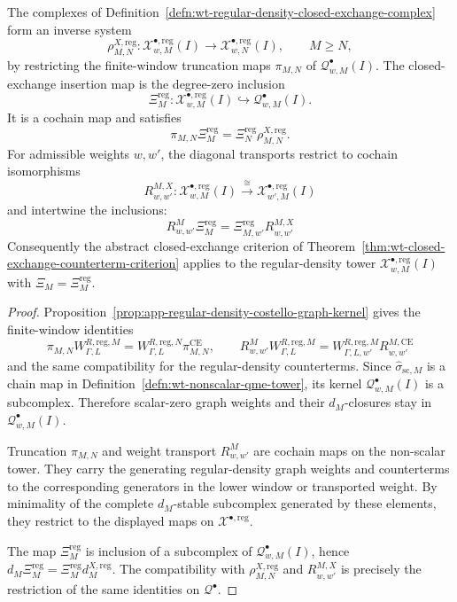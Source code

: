 \begin{prop}
\label{prop:wt-regular-density-X-Xi-construction}
  The complexes of
  Definition~\ref{defn:wt-regular-density-closed-exchange-complex} form an
  inverse system
  \[
    \rho^{X,\mathrm{reg}}_{M,N}\colon
    \mathcal X^{\bullet,\mathrm{reg}}_{w,M}(I)
      \longrightarrow
    \mathcal X^{\bullet,\mathrm{reg}}_{w,N}(I),
    \qquad M\geq N,
  \]
  by restricting the finite-window truncation maps
  \(\pi_{M,N}\) of \(\mathcal Q^\bullet_{w,M}(I)\).  The closed-exchange
  insertion map is the degree-zero inclusion
  \[
    \Xi^{\mathrm{reg}}_M\colon
    \mathcal X^{\bullet,\mathrm{reg}}_{w,M}(I)
      \hookrightarrow
    \mathcal Q^\bullet_{w,M}(I).
  \]
  It is a cochain map and satisfies
  \[
    \pi_{M,N}\Xi^{\mathrm{reg}}_M
      =
    \Xi^{\mathrm{reg}}_N\rho^{X,\mathrm{reg}}_{M,N}.
  \]
  For admissible weights \(w,w'\), the diagonal transports restrict to
  cochain isomorphisms
  \[
    R^{M,X}_{w,w'}\colon
    \mathcal X^{\bullet,\mathrm{reg}}_{w,M}(I)
      \xrightarrow{\cong}
    \mathcal X^{\bullet,\mathrm{reg}}_{w',M}(I)
  \]
  and intertwine the inclusions:
  \[
    R^M_{w,w'}\Xi^{\mathrm{reg}}_M
      =
    \Xi^{\mathrm{reg}}_{M,w'}R^{M,X}_{w,w'}
  \]
  Consequently the abstract closed-exchange criterion of
  Theorem~\ref{thm:wt-closed-exchange-counterterm-criterion} applies to
  the regular-density tower
  \(\mathcal X^{\bullet,\mathrm{reg}}_{w,M}(I)\) with
  \(\Xi_M=\Xi^{\mathrm{reg}}_M\).
\end{prop}

\begin{proof}
  Proposition~\ref{prop:app-regular-density-costello-graph-kernel} gives
  the finite-window identities
  \[
    \pi_{M,N}W^{R,\mathrm{reg},M}_{\Gamma,L}
      =
    W^{R,\mathrm{reg},N}_{\Gamma,L}\pi^{\mathrm{CE}}_{M,N},
    \qquad
    R^M_{w,w'}W^{R,\mathrm{reg},M}_{\Gamma,L}
      =
    W^{R,\mathrm{reg},M}_{\Gamma,L,w'}R^{M,\mathrm{CE}}_{w,w'}
  \]
  and the same compatibility for the regular-density counterterms.  Since
  \(\widehat\sigma_{\mathrm{sc},M}\) is a chain map in
  Definition~\ref{defn:wt-nonscalar-qme-tower}, its kernel
  \(\mathcal Q^\bullet_{w,M}(I)\) is a subcomplex.  Therefore scalar-zero
  graph weights and their \(d_M\)-closures stay in
  \(\mathcal Q^\bullet_{w,M}(I)\).

  Truncation \(\pi_{M,N}\) and weight transport \(R^M_{w,w'}\) are cochain
  maps on the non-scalar tower.  They carry the generating regular-density
  graph weights and counterterms to the corresponding generators in the
  lower window or transported weight.  By minimality of the complete
  \(d_M\)-stable subcomplex generated by these elements, they restrict to
  the displayed maps on \(\mathcal X^{\bullet,\mathrm{reg}}\).

  The map \(\Xi^{\mathrm{reg}}_M\) is inclusion of a subcomplex of
  \(\mathcal Q^\bullet_{w,M}(I)\), hence
  \(d_M\Xi^{\mathrm{reg}}_M=\Xi^{\mathrm{reg}}_Md^{X,\mathrm{reg}}_M\).
  The compatibility with \(\rho^{X,\mathrm{reg}}_{M,N}\) and
  \(R^{M,X}_{w,w'}\) is precisely the restriction of the same identities
  on \(\mathcal Q^\bullet\).
\end{proof}

